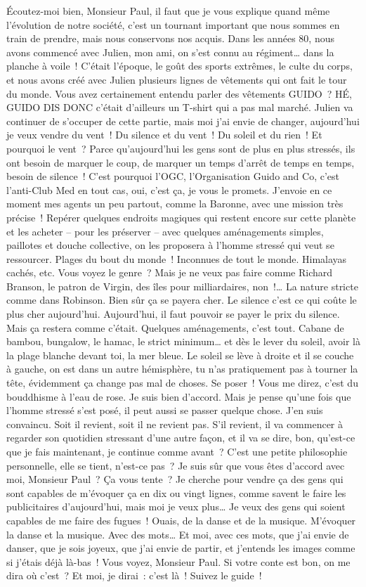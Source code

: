 \documentclass[french,twoside]{book} %
\begin{document}
\noindent Écoutez-moi bien, Monsieur Paul, il faut que je vous explique quand même l’évolution de notre société, c’est un tournant important que nous sommes en train de prendre, mais nous conservons nos acquis. Dans les années 80, nous avons commencé avec Julien, mon ami, on s’est connu au régiment… dans la planche à voile ! C’était l’époque, le goût des sports extrêmes, le culte du corps, et nous avons créé avec Julien plusieurs lignes de vêtements qui ont fait le tour du monde. Vous avez certainement entendu parler des vêtements GUIDO ? HÉ, GUIDO DIS DONC c’était d’ailleurs un T-shirt qui a pas mal marché. Julien va continuer de s’occuper de cette partie, mais moi j’ai envie de changer, aujourd’hui je veux vendre du vent ! Du silence et du vent ! Du soleil et du rien ! Et pourquoi le vent ? Parce qu’aujourd’hui les gens sont de plus en plus stressés, ils ont besoin de marquer le coup, de marquer un temps d’arrêt de temps en temps, besoin de silence ! C’est pourquoi l’OGC, l’Organisation Guido and Co, c’est l’anti-Club Med en tout cas, oui, c’est ça, je vous le promets. J’envoie en ce moment mes agents un peu partout, comme la Baronne, avec une mission très précise ! Repérer quelques endroits magiques qui restent encore sur cette planète et les acheter – pour les préserver – avec quelques aménagements simples, paillotes et douche collective, on les proposera à l’homme stressé qui veut se ressourcer. Plages du bout du monde ! Inconnues de tout le monde. Himalayas cachés, etc. Vous voyez le genre ? Mais je ne veux pas faire comme Richard Branson, le patron de Virgin, des îles pour milliardaires, non !… La nature stricte comme dans Robinson. Bien sûr ça se payera cher. Le silence c’est ce qui coûte le plus cher aujourd’hui. Aujourd’hui, il faut pouvoir se payer le prix du silence. Mais ça restera comme c’était. Quelques aménagements, c’est tout. Cabane de bambou, bungalow, le hamac, le strict minimum… et dès le lever du soleil, avoir là la plage blanche devant toi, la mer bleue. Le soleil se lève à droite et il se couche à gauche, on est dans un autre hémisphère, tu n’as pratiquement pas à tourner la tête, évidemment ça change pas mal de choses. Se poser ! Vous me direz, c’est du bouddhisme à l’eau de rose. Je suis bien d’accord. Mais je pense qu’une fois que l’homme stressé s’est posé, il peut aussi se passer quelque chose. J’en suis convaincu. Soit il revient, soit il ne revient pas. S’il revient, il va commencer à regarder son quotidien stressant d’une autre façon, et il va se dire, bon, qu’est-ce que je fais maintenant, je continue comme avant ? C’est une petite philosophie personnelle, elle se tient, n’est-ce pas ? Je suis sûr que vous êtes d’accord avec moi, Monsieur Paul ? Ça vous tente ? Je cherche pour vendre ça des gens qui sont capables de m’évoquer ça en dix ou vingt lignes, comme savent le faire les publicitaires d’aujourd’hui, mais moi je veux plus… Je veux des gens qui soient capables de me faire des fugues ! Ouais, de la danse et de la musique. M’évoquer la danse et la musique. Avec des mots… Et moi, avec ces mots, que j’ai envie de danser, que je sois joyeux, que j’ai envie de partir, et j’entends les images comme si j’étais déjà là-bas ! Vous voyez, Monsieur Paul. Si votre conte est bon, on me dira où c’est ? Et moi, je dirai : c’est là ! Suivez le guide ! 
\end{document}

